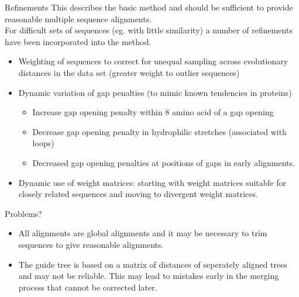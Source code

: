 \documentclass[pdf]{beamer}
\begin{document}
\begin{frame}{Refinements}
  This describes the basic method and should be sufficient to provide
  reasonable multiple sequence alignments.\\
  For difficult sets of sequences (eg. with little similarity) a number
  of refinements have been incorporated into the method.
  \small
  \begin{itemize}
  \item Weighting of sequences to correct for unequal sampling across
    evolutionary distances in the data set (greater weight to outlier sequences)
  \item Dynamic variation of gap penalties (to mimic known tendencies in
    proteins)
    \begin{itemize}
    \item Increase gap opening penalty within 8 amino acid of a gap opening
    \item Decrease gap opening penalty in hydrophilic stretches (associated
      with loops)
    \item Decreased gap opening penalties at positions of gaps in early
      alignments.
    \end{itemize}
  \item Dynamic use of weight matrices: starting with weight matrices suitable
    for closely related sequences and moving to divergent weight matrices.
  \end{itemize}
\end{frame}

\begin{frame}{Problems?}
  \begin{itemize}
    \item All alignments are global alignments and it may be necessary to
      trim sequences to give reasonable alignments.
    \item The guide tree is based on a matrix of distances of seperately aligned
      trees and may not be reliable. This may lead to mistakes early in the
      merging process that cannot be corrected later.
  \end{itemize}
  
\end{frame}
\end{document}
